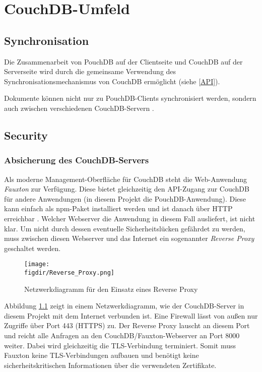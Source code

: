 \chapter{CouchDB-Umfeld}
\label{Umfeld}

\section{Synchronisation}

Die Zusammenarbeit von PouchDB auf der Clientseite und CouchDB auf der Serverseite wird durch die gemeinsame Verwendung des Synchronisationsmechanismus von CouchDB ermöglicht (siehe \ref{API}).

Dokumente können nicht nur zu PouchDB-Clients synchronisiert werden, sondern auch zwischen verschiedenen CouchDB-Servern \cite{couch:replication}.

\section{Security}

\subsection{Absicherung des CouchDB-Servers}

Als moderne Management-Oberfläche für CouchDB steht die Web-Anwendung \emph{Fauxton} zur Verfügung. Diese bietet gleichzeitig den API-Zugang zur CouchDB für andere Anwendungen (in diesem Projekt die PouchDB-Anwendung). Diese kann einfach als npm-Paket installiert werden und ist danach über HTTP erreichbar \cite{fauxton:overview}. Welcher Webserver die Anwendung in diesem Fall ausliefert, ist nicht klar. Um nicht durch dessen eventuelle Sicherheitslücken gefährdet zu werden, muss zwischen diesen Webserver und das Internet ein sogenannter \emph{Reverse Proxy} geschaltet werden.

\begin{figure}[htb]
	\centering
	\caption{Netzwerkdiagramm für den Einsatz eines Reverse Proxy}
	\label{fig:reverseproxy}
	\texttt{[image: \\figdir/Reverse\_Proxy.png]}
\end{figure}

Abbildung \ref{fig:reverseproxy} zeigt in einem Netzwerkdiagramm, wie der CouchDB-Server in diesem Projekt mit dem Internet verbunden ist. Eine Firewall lässt von außen nur Zugriffe über Port 443 (HTTPS) zu. Der Reverse Proxy lauscht an diesem Port und reicht alle Anfragen an den CouchDB/Fauxton-Webserver an Port 8000 weiter. Dabei wird gleichzeitig die TLS-Verbindung terminiert. Somit muss Fauxton keine TLS-Verbindungen aufbauen und benötigt keine sicherheitskritischen Informationen über die verwendeten Zertifikate.

